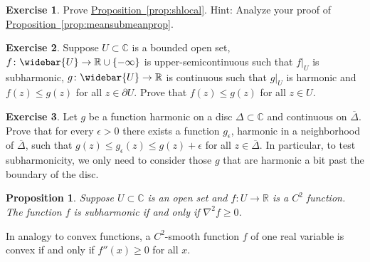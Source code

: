 \documentclass[12pt,openany]{book}
\newcommand{\C}{{\mathbb{C}}}
\newcommand{\R}{{\mathbb{R}}}
\theoremstyle{plain}
\newtheorem{prop}[thm]{Proposition}
\theoremstyle{remark}
\theoremstyle{definition}
\newenvironment{exbox}{%
    \def\FrameCommand{\vrule width 1pt \relax\hspace{10pt}}%
    \MakeFramed{\advance\hsize-\width\FrameRestore}%
}{%
    \endMakeFramed
}
\theoremstyle{exercise}
\newtheorem{exercise}{Exercise}[section]
\theoremstyle{example}
\newcommand{\exerciseref}[1]{\hyperref[#1]{Exercise~\ref*{#1}}}
\newcommand{\propref}[1]{\hyperref[#1]{Proposition~\ref*{#1}}}
\begin{document}
\begin{exbox}
\begin{exercise}
Prove \propref{prop:shlocal}.
Hint: Analyze your proof of \propref{prop:meansubmeanprop}.
\end{exercise}

\begin{exercise}
Suppose $U \subset \C$ is a bounded open set, $f \colon \widebar{U} \to \R
\cup \{-\infty\}$ is upper-semicontinuous such that $f|_U$
is subharmonic, $g \colon \widebar{U} \to \R$ is continuous
such that $g|_U$ is harmonic and
$f(z) \leq g(z)$ for all $z \in \partial U$.  Prove that
$f(z) \leq g(z)$ for all $z \in U$.
\end{exercise}

\begin{exercise} \label{exercise:onlyniceuneededforsubharmonic}
Let $g$ be a function
harmonic on a disc $\Delta \subset \C$ and continuous on
$\overline{\Delta}$.  Prove that for every $\epsilon > 0$ there exists
a function $g_\epsilon$, harmonic in a neighborhood of $\overline{\Delta}$,
such that $g(z) \leq g_\epsilon(z) \leq g(z)+\epsilon$ for all $z \in
\overline{\Delta}$.
In particular, to test subharmonicity, we only need to consider those
$g$ that are harmonic a bit past the boundary of the disc.
\end{exercise}
\end{exbox}

\begin{prop}
Suppose $U \subset \C$ is an open set and $f \colon U \to \R$ is a $C^2$ function.
The function $f$ is subharmonic if and only if
$\nabla^2 f \geq 0$.
\end{prop}

In analogy to convex functions, a $C^2$-smooth function $f$ of one
real variable is convex if and only if $f''(x) \geq 0$ for all $x$.
\end{document}
